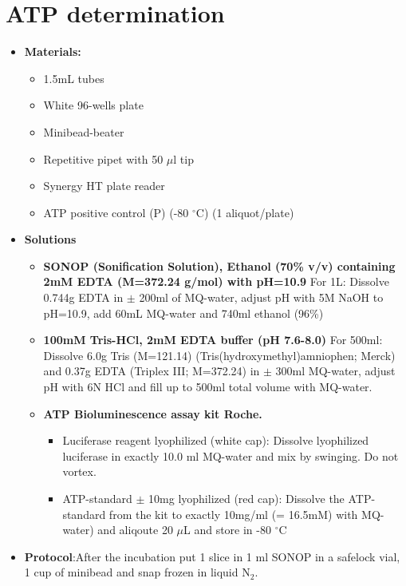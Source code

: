 \documentclass{EU-report}
\begin{document}
\section{ATP determination}
\label{atp}
\begin{itemize}
\item \textbf{Materials:}
\begin{itemize}
\item 1.5mL tubes
\item White 96-wells plate
\item Minibead-beater
\item Repetitive pipet with 50 $\mu$l tip
\item Synergy HT plate reader
\item ATP positive control (P) (-80 $^{\circ}$C) (1 aliquot/plate)
\end{itemize}
\item \textbf{Solutions}
\begin{itemize}
\item \textbf{SONOP (Sonification Solution), Ethanol (70\% v/v) containing 2mM EDTA (M=372.24 g/mol) with pH=10.9}
For 1L: Dissolve 0.744g EDTA in $\pm$ 200ml of MQ-water, adjust pH with 5M NaOH to pH=10.9, add 60mL MQ-water and 740ml ethanol (96\%)
\item \textbf{100mM Tris-HCl, 2mM EDTA buffer (pH 7.6-8.0)} For 500ml: Dissolve 6.0g Tris (M=121.14) (Tris(hydroxymethyl)amniophen; Merck) and 0.37g EDTA (Triplex III; M=372.24) in $\pm$ 300ml MQ-water, adjust pH with 6N HCl and fill up to 500ml total volume with MQ-water.
\item \textbf{ATP Bioluminescence assay kit Roche.}
\begin{itemize}
\item Luciferase reagent lyophilized (white cap):
Dissolve lyophilized luciferase in exactly 10.0 ml MQ-water and mix by swinging. Do not vortex.
\item ATP-standard $\pm$ 10mg lyophilized (red cap):
 Dissolve the ATP-standard from the kit to exactly 10mg/ml (= 16.5mM) with MQ-water) and aliqoute 20 $\mu$L and store in -80 $^{\circ}$C
\end{itemize}
\end{itemize}
\item \textbf{Protocol}:After the incubation put 1 slice in 1 ml SONOP in a safelock vial, 1 cup of minibead and snap frozen in liquid N$_2$.
\begin{enumerate}

\end{enumerate}
\end{itemize}
\end{document}
